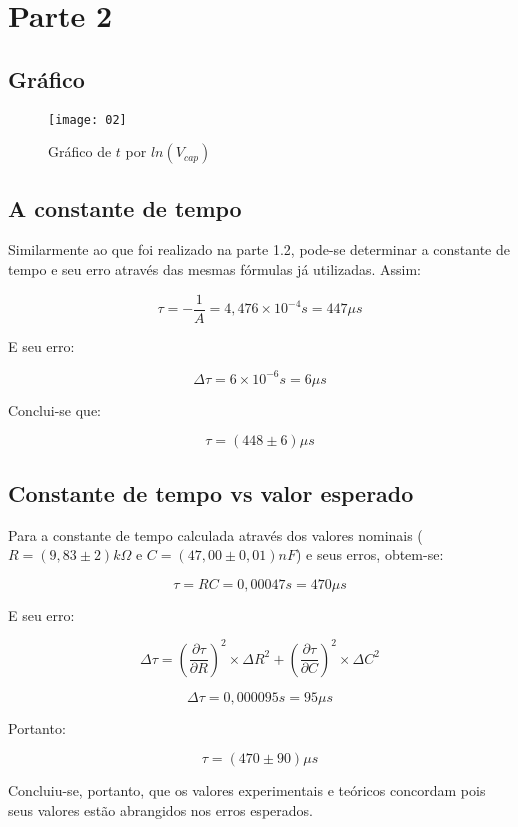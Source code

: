 \section{Parte 2}
    \subsection{Gráfico}
        \begin{figure} [H] 
            \texttt{[image: 02]}
            \caption{Gráfico de $t$ por $ln(V_{cap})$}
            \label{fig:02}
        \end{figure}

    \subsection{A constante de tempo}
        
        Similarmente ao que foi realizado na parte 1.2, pode-se determinar 
        a constante de tempo e seu erro através das mesmas fórmulas já utilizadas. 
        Assim:

        $$\tau = -\frac{1}{A} = 4,476 \times 10^{-4} s = 447 \mu s$$

        E seu erro:

        $$\Delta\tau = 6 \times 10^{-6}s = 6\mu s$$

        Conclui-se que:

        $$\tau = (448 \pm 6) \mu s$$

    \subsection{Constante de tempo vs valor esperado}

        Para a constante de tempo calculada através dos valores nominais
        ($R = (9,83 \pm 2) k\Omega$ e $C = (47,00 \pm 0,01) nF$) 
        e seus erros, obtem-se:

        $$\tau = RC = 0,00047s = 470\mu s$$

        E seu erro:

        $$\Delta\tau = (\frac{\partial\tau}{\partial R})^2 \times \Delta R^2
        + (\frac{\partial\tau}{\partial C})^2\times\Delta C^2$$

        $$\Delta\tau = 0,000095s = 95\mu s$$

        Portanto:

        $$\tau = (470 \pm 90)\mu s$$

        Concluiu-se, portanto, que os valores experimentais e teóricos 
        concordam pois seus valores estão abrangidos nos erros esperados.